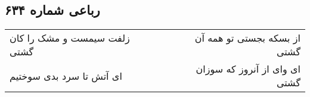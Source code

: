 \begin{center}
\section*{رباعی شماره ۶۳۴}
\label{sec:sh634}
\begin{longtable}{l p{0.5cm} r}
زلفت سیمست و مشک را کان گشتی
&&
از بسکه بجستی تو همه آن گشتی
\\
ای آتش تا سرد بدی سوختیم
&&
ای وای از آنروز که سوزان گشتی
\\
\end{longtable}
\end{center}
